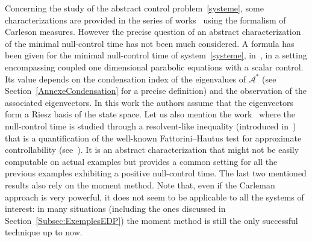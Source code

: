 \documentclass[AHL,Unicode,longabstracts]{cedram}
\newcommand\As{\mathcal{A}^*}
\begin{document}
Concerning the study of the abstract control problem~\eqref{systeme}, some characterizations are provided in the series of works~\cite{TheseGaunard,JacobPartingtonPott2007,JacobPartingtonPott2010, JacobPartingtonPott2013,JacobPartingtonPott2014} using the formalism of Carleson measures. However the precise question of an abstract characterization of the minimal null-control time has not been much considered. A formula has been given for the minimal null-control time of system~\eqref{systeme}, in~\cite{AmmarKhodjaBenabdallahGonzalez-BurgosdeTeresa:2014}, in a setting encompassing coupled one dimensional parabolic equations with a scalar control. Its value depends on the condensation index of the eigenvalues of $\As$ (see Section~\ref{AnnexeCondensation} for a precise definition) and the observation of the associated eigenvectors. In this work the authors assume that the eigenvectors form a Riesz basis of the state space. Let us also mention the work~\cite{AKBGBM_2018} where the null-control time is studied through a resolvent-like inequality (introduced in~\cite{DuyckaertsMiller12}) that is a quantification of the well-known Fattorini--Hautus test for approximate controllability (see~\cite{Fattorini66, Olive13}). It is an abstract characterization that might not be easily computable on actual examples but provides a common setting for all the previous examples exhibiting a positive null-control time. The last two mentioned results also rely on the moment method. Note that, even if the Carleman approach is very powerful, it does not seem to be applicable to all the systems of interest: in many situations (including the ones discussed in Section~\ref{Subsec:ExemplesEDP}) the moment method is still the only successful technique up to now.
\end{document}
